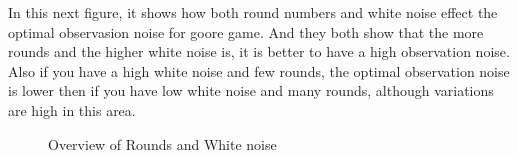 In this next figure, it shows how both round numbers and white noise effect the optimal observasion noise for
goore game. And they both show that the more rounds and the higher white noise is, it is better to have a high
observation noise. Also if you have a high white noise and few rounds, the optimal observation noise is 
lower then if you have low white noise and many rounds, although variations are high in this area. 


\begin{figure}[htbp]
    \hspace*{-2.5cm}
    \begin{minipage}[c]{0.39\textwidth}
    \end{minipage}
    \hspace*{7.5cm}
    \begin{minipage}[c]{0.49\textwidth}
    \end{minipage}
\caption{Overview of Rounds and White noise}
\label{fig:ex10}
\end{figure}